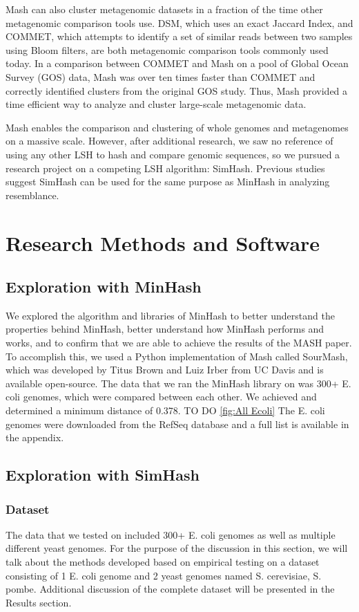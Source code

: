 \documentclass[12pt, letterpaper]{article}
\begin{document}
Mash can also cluster metagenomic datasets in a fraction of the time other metagenomic comparison tools use. DSM, which uses an exact Jaccard Index, and COMMET, which attempts to identify a set of similar reads between two samples using Bloom filters, are both metagenomic comparison tools commonly used today. In a comparison between COMMET and Mash on a pool of Global Ocean Survey (GOS) data, Mash was over ten times faster than COMMET and correctly identified clusters from the original GOS study. Thus, Mash provided a time efficient way to analyze and cluster large-scale metagenomic data.

Mash enables the comparison and clustering of whole genomes and metagenomes on a massive scale. However, after additional research, we saw no reference of using any other LSH to hash and compare genomic sequences, so we pursued a research project on a competing LSH algorithm: SimHash. Previous studies suggest SimHash can be used for the same purpose as MinHash in analyzing resemblance. 

\section{Research Methods and Software}


\subsection{Exploration with MinHash}
We explored the algorithm and libraries of MinHash to better understand the properties behind MinHash, better understand how MinHash performs and works, and to confirm that we are able to achieve the results of the MASH paper. To accomplish this, we used a Python implementation of Mash called SourMash\cite{GitHub-Sourmash}, which was developed by Titus Brown and Luiz Irber from UC Davis and is available open-source. The data that we ran the MinHash library on was 300+ E. coli genomes, which were compared between each other. We achieved and determined a minimum distance of 0.378. \color{red} TO DO \color{black} \ref{fig:All Ecoli} The E. coli genomes were downloaded from the RefSeq database and a full list is available in the appendix.


\subsection{Exploration with SimHash}
\subsubsection{Dataset}
The data that we tested on included 300+ E. coli genomes as well as multiple different yeast genomes. For the purpose of the discussion in this section, we will talk about the methods developed based on empirical testing on a dataset consisting of 1 E. coli genome and 2 yeast genomes named S. cerevisiae, S. pombe. Additional discussion of the complete dataset will be presented in the Results section.
\end{document}
